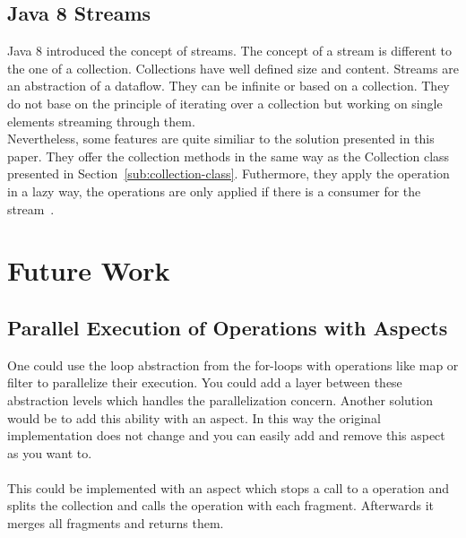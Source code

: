 \documentclass[runningheads,a4paper]{llncs}
\begin{document}
\subsection{Java 8 Streams}
Java 8 introduced the concept of streams. The concept of a stream is different to the one of a collection.
Collections have well defined size and content. Streams are an abstraction of a dataflow. They can be infinite or based on a collection.
They do not base on the principle of iterating over a collection but working on single elements streaming through them.\\
Nevertheless, some features are quite similiar to the solution presented in this paper.
They offer the collection methods in the same way as the Collection class presented in Section~\ref{sub:collection-class}.
Futhermore, they apply the operation in a lazy way, the operations are only applied if there is a consumer for the stream~\cite{java8streams}.
\\


\section{Future Work}\label{sec:future-work}
\subsection{Parallel Execution of Operations with Aspects}\label{sub:parallel-execution}
One could use the loop abstraction from the for-loops with operations like map or filter to parallelize their execution.
You could add a layer between these abstraction levels which handles the parallelization concern. Another solution would be to add this ability with an aspect.
In this way the original implementation does not change and you can easily add and remove this aspect as you want to.\\
\\
This could be implemented with an aspect which stops a call to a operation and splits the collection and calls the operation with each fragment. Afterwards it merges all fragments and returns them.
\end{document}
